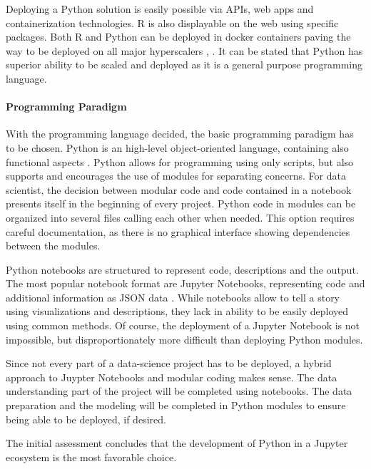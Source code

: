 Deploying a Python solution is easily possible via APIs, web apps and containerization technologies. R is also displayable on the web using specific packages. Both R and Python can be deployed in docker containers paving the way to be deployed on all major hyperscalers \cite{rDocker}, \cite{pythonDocker}.
It can be stated that Python has superior ability to be scaled and deployed as it is a general purpose programming language. 

\paragraph{Programming Paradigm}
With the programming language decided, the basic programming paradigm has to be chosen. Python is an high-level object-oriented language, containing also functional aspects \cite[ch.~1.3.2]{corePython}. Python allows for programming using only scripts, but also supports and encourages the use of modules for separating concerns.
For data scientist, the decision between modular code and code contained in a notebook presents itself in the beginning of every project. Python code in modules can be organized into several files calling each other when needed. This option requires careful documentation, as there is no graphical interface showing dependencies between the modules.

Python notebooks are structured to represent code, descriptions and the output. The most popular notebook format are Jupyter Notebooks, representing code and additional information as \ac{JSON} data \cite{jupyterteramArchitecture}.
While notebooks allow to tell a story using visualizations and descriptions, they lack in ability to be easily deployed using common methods. Of course, the deployment of a Jupyter Notebook is not impossible, but disproportionately more difficult than deploying Python modules.

Since not every part of a data-science project has to be deployed, a hybrid approach to Juypter Notebooks and modular coding makes sense. The data understanding part of the project will be completed using notebooks. The data preparation and the modeling will be completed in Python modules to ensure being able to be deployed, if desired.

The initial assessment concludes that the development of Python in a Jupyter ecosystem is the most favorable choice.










